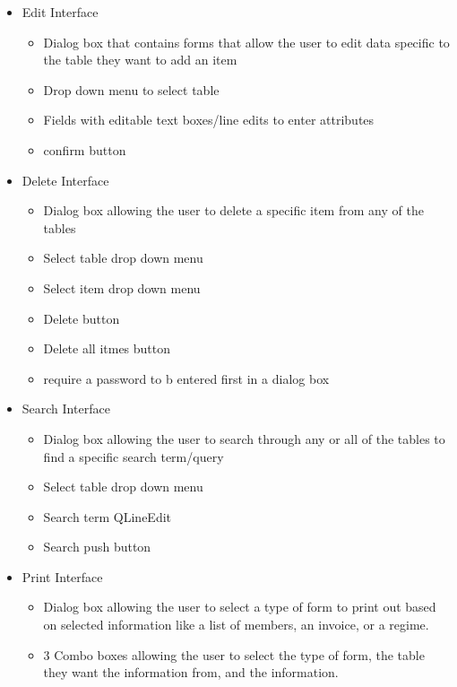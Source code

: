 \begin {itemize}
\begin {itemize}
\begin {itemize}
\begin {itemize}
		\item Drop down menu to select table
		\item Fields with editable text boxes/line edits to enter attributes
		\item confirm button
	\end {itemize}
	\item Edit Interface
    \begin {itemize}
	    \item Dialog box that contains forms that allow the user to edit data specific to the table they want to add an item 
		\item Drop down menu to select table
		\item Fields with editable text boxes/line edits to enter attributes
		\item confirm button
	\end {itemize}
	\item Delete Interface
	\begin {itemize}
	    \item Dialog box allowing the user to delete a specific item from any of the tables
		\item Select table drop down menu
		\item Select item drop down menu
		\item Delete button
		\item Delete all itmes button
		\item require a password to b entered first in a dialog box
	\end {itemize}
	\item Search Interface
	\begin {itemize}
	    \item Dialog box allowing the user to search through any or all of the tables to find a specific search term/query
		\item Select table drop down menu
		\item Search term QLineEdit
		\item Search push button
	\end {itemize}
	\item Print Interface
	\begin{itemize}
	    \item Dialog box allowing the user to select a type of form to print out based on selected information like a list of members, an invoice, or a regime.
	    \item 3 Combo boxes allowing the user to select the type of form, the table they want the information from, and the information.

\end{itemize}
\end{itemize}
\end{itemize}
\end{itemize}
